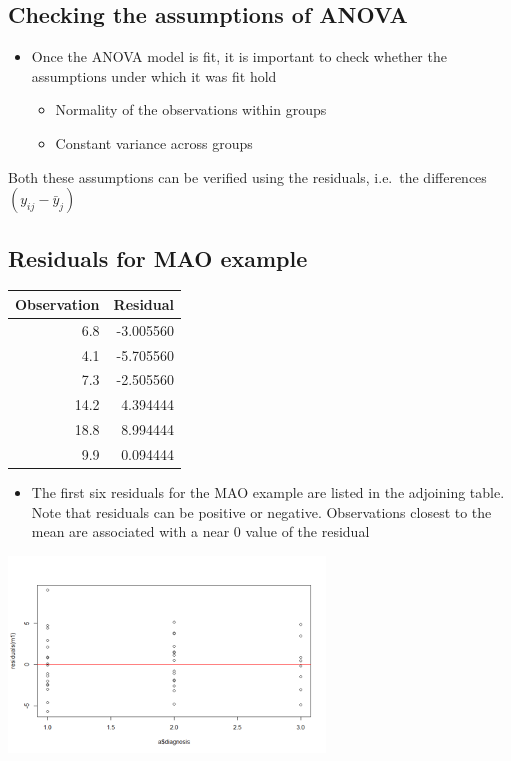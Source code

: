 \documentclass[
]{book}
\providecommand{\tightlist}{%
  \setlength{\itemsep}{0pt}\setlength{\parskip}{0pt}}
\begin{document}
\hypertarget{checking-the-assumptions-of-anova}{%
\subsection{Checking the assumptions of ANOVA}\label{checking-the-assumptions-of-anova}}

\begin{itemize}
\tightlist
\item
  Once the ANOVA model is fit, it is important to check whether the assumptions under which it was fit hold

  \begin{itemize}
  \tightlist
  \item
    Normality of the observations within groups
  \item
    Constant variance across groups
  \end{itemize}
\end{itemize}

Both these assumptions can be verified using the residuals, i.e.~the differences \((y_{ij}-\bar y_j)\)

\hypertarget{residuals-for-mao-example}{%
\subsection{Residuals for MAO example}\label{residuals-for-mao-example}}

\begin{tabular}{r|r}
\hline
Observation & Residual\\
\hline
6.8 & -3.005560\\
\hline
4.1 & -5.705560\\
\hline
7.3 & -2.505560\\
\hline
14.2 & 4.394444\\
\hline
18.8 & 8.994444\\
\hline
9.9 & 0.094444\\
\hline
\end{tabular}

\begin{itemize}
\tightlist
\item
  The first six residuals for the MAO example are listed in the adjoining table. Note that residuals can be positive or negative. Observations closest to the mean are associated with a near 0 value of the residual
\end{itemize}

\includegraphics[width=0.5\linewidth]{./10_41}
\end{document}
